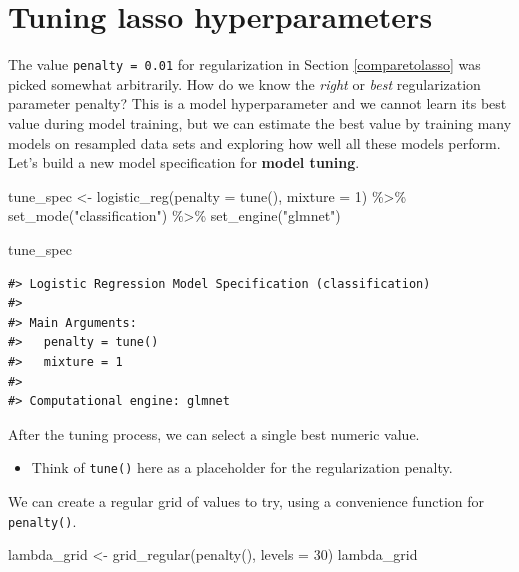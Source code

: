 \documentclass[
]{krantz}
\makeatletter
\newenvironment{Shaded}{\begin{snugshade}}{\end{snugshade}}
\newcommand{\AttributeTok}[1]{\textcolor[rgb]{0.77,0.63,0.00}{#1}}
\newcommand{\DecValTok}[1]{\textcolor[rgb]{0.00,0.00,0.81}{#1}}
\newcommand{\FunctionTok}[1]{\textcolor[rgb]{0.00,0.00,0.00}{#1}}
\newcommand{\NormalTok}[1]{#1}
\newcommand{\OtherTok}[1]{\textcolor[rgb]{0.56,0.35,0.01}{#1}}
\newcommand{\SpecialCharTok}[1]{\textcolor[rgb]{0.00,0.00,0.00}{#1}}
\newcommand{\StringTok}[1]{\textcolor[rgb]{0.31,0.60,0.02}{#1}}
\newenvironment{kframe}{%
\medskip{}
\setlength{\fboxsep}{.8em}
 \def\at@end@of@kframe{}%
 \ifinner\ifhmode%
  \def\at@end@of@kframe{\end{minipage}}%
  \begin{minipage}{\columnwidth}%
 \fi\fi%
 \def\FrameCommand##1{\hskip\@totalleftmargin \hskip-\fboxsep
 \colorbox{shadecolor}{##1}\hskip-\fboxsep
     \hskip-\linewidth \hskip-\@totalleftmargin \hskip\columnwidth}%
 \MakeFramed {\advance\hsize-\width
   \@totalleftmargin\z@ \linewidth\hsize
   \@setminipage}}%
 {\par\unskip\endMakeFramed%
 \at@end@of@kframe}
\renewenvironment{Shaded}{\begin{kframe}}{\end{kframe}}
\newenvironment{rmdblock}[1]
  {\begin{shaded*}
  \begin{itemize}[left = -1cm, labelsep = 1cm]
  \renewcommand{\labelitemi}{
    \raisebox{-.7\height}[0pt][0pt]{
      {\setkeys{Gin}{width=3em,keepaspectratio}\texttt{[image: images/\#1]}}
    }
  }
 
  \item
  }
  {
  \end{itemize}
  \end{shaded*}
  }
\newenvironment{rmdnote}
  {\begin{rmdblock}{note}}
  {\end{rmdblock}}
\makeatother
\begin{document}
\hypertarget{tunelasso}{%
\section{Tuning lasso hyperparameters}\label{tunelasso}}

The value \texttt{penalty\ =\ 0.01} for regularization in Section \ref{comparetolasso} was picked somewhat arbitrarily. How do we know the \emph{right} or \emph{best} regularization parameter penalty? This is a model hyperparameter and we cannot learn its best value during model training, but we can estimate the best value by training many models on resampled data sets and exploring how well all these models perform. Let's build a new model specification for \textbf{model tuning}.

\begin{Shaded}
\begin{Highlighting}[]
\NormalTok{tune\_spec }\OtherTok{\textless{}{-}} \FunctionTok{logistic\_reg}\NormalTok{(}\AttributeTok{penalty =} \FunctionTok{tune}\NormalTok{(), }\AttributeTok{mixture =} \DecValTok{1}\NormalTok{) }\SpecialCharTok{\%\textgreater{}\%}
  \FunctionTok{set\_mode}\NormalTok{(}\StringTok{"classification"}\NormalTok{) }\SpecialCharTok{\%\textgreater{}\%}
  \FunctionTok{set\_engine}\NormalTok{(}\StringTok{"glmnet"}\NormalTok{)}

\NormalTok{tune\_spec}
\end{Highlighting}
\end{Shaded}

\begin{verbatim}
#> Logistic Regression Model Specification (classification)
#> 
#> Main Arguments:
#>   penalty = tune()
#>   mixture = 1
#> 
#> Computational engine: glmnet
\end{verbatim}

After the tuning process, we can select a single best numeric value.

\begin{rmdnote}
Think of \texttt{tune()} here as a placeholder for the regularization
penalty.
\end{rmdnote}

We can create a regular grid of values to try, using a convenience function for \texttt{penalty()}.

\begin{Shaded}
\begin{Highlighting}[]
\NormalTok{lambda\_grid }\OtherTok{\textless{}{-}} \FunctionTok{grid\_regular}\NormalTok{(}\FunctionTok{penalty}\NormalTok{(), }\AttributeTok{levels =} \DecValTok{30}\NormalTok{)}
\NormalTok{lambda\_grid}
\end{Highlighting}
\end{Shaded}
\end{document}
